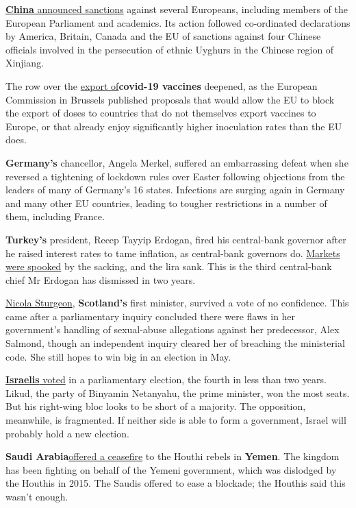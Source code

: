\documentclass{article}
\begin{document}
\href{/node/21799725}{\textbf{China} announced sanctions} against several Europeans, including members of the European Parliament and academics. Its action followed co-ordinated declarations by America, Britain, Canada and the EU of sanctions against four Chinese officials involved in the persecution of ethnic Uyghurs in the Chinese region of Xinjiang. 

The row over the \href{/europe/2021/03/25/europes-plans-to-restrict-vaccine-exports-endanger-itself-and-the-world}{export of}\textbf{covid-19 vaccines} deepened, as the European Commission in Brussels published proposals that would allow the EU to block the export of doses to countries that do not themselves export vaccines to Europe, or that already enjoy significantly higher inoculation rates than the EU does. 

\textbf{Germany's} chancellor, Angela Merkel, suffered an embarrassing defeat when she reversed a tightening of lockdown rules over Easter following objections from the leaders of many of Germany's 16 states. Infections are surging again in Germany and many other EU countries, leading to tougher restrictions in a number of them, including France. 

\textbf{Turkey's} president, Recep Tayyip Erdogan, fired his central-bank governor after he raised interest rates to tame inflation, as central-bank governors do. \href{/node/21799710}{Markets were spooked} by the sacking, and the lira sank. This is the third central-bank chief Mr Erdogan has dismissed in two years. 

\href{/node/21799714}{Nicola Sturgeon}, \textbf{Scotland's} first minister, survived a vote of no confidence. This came after a parliamentary inquiry concluded there were flaws in her government's handling of sexual-abuse allegations against her predecessor, Alex Salmond, though an independent inquiry cleared her of breaching the ministerial code. She still hopes to win big in an election in May. 

\href{/node/21799726}{\textbf{Israelis} voted} in a parliamentary election, the fourth in less than two years. Likud, the party of Binyamin Netanyahu, the prime minister, won the most seats. But his right-wing bloc looks to be short of a majority. The opposition, meanwhile, is fragmented. If neither side is able to form a government, Israel will probably hold a new election. 

\textbf{Saudi Arabia}\href{/node/21799727}{offered a ceasefire} to the Houthi rebels in \textbf{Yemen}. The kingdom has been fighting on behalf of the Yemeni government, which was dislodged by the Houthis in 2015. The Saudis offered to ease a blockade; the Houthis said this wasn't enough. 
\end{document}
